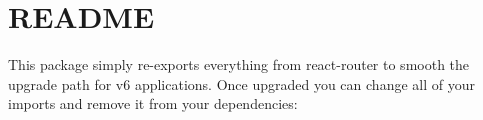 \chapter{README}
\hypertarget{md__project5___h_r_2_project5___h_r___front___end_2node__modules_2react-router-dom_2_r_e_a_d_m_e}{}\label{md__project5___h_r_2_project5___h_r___front___end_2node__modules_2react-router-dom_2_r_e_a_d_m_e}
This package simply re-\/exports everything from {\ttfamily react-\/router} to smooth the upgrade path for v6 applications. Once upgraded you can change all of your imports and remove it from your dependencies\+:


\begin{DoxyCode}{0}

\end{DoxyCode}
 